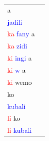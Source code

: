 \documentclass[output=paper,colorlinks,citecolor=brown]{langscibook}
\begin{document}
\begin{table}
\begin{minipage}{.24\textwidth}
\begin{tabular}{ll} 
\lsptoprule
a \\
\textcolor{blue}{jadili}   \\
\textcolor{red}{ka} \textcolor{blue}{fany} a     \\ 
\textcolor{red}{ka} \textcolor{blue}{zidi}       \\ 
\textcolor{red}{ki} \textcolor{blue}{ingi} a     \\ 
\textcolor{red}{ki} \textcolor{blue}{w} a  \\
\textcolor{red}{ki} wemo   \\
ko   \\
\textcolor{blue}{kubali}   \\   
\textcolor{red}{li} ko  \\
\textcolor{red}{li} \textcolor{blue}{kubali}      \\ 


\end{tabular}
\end{minipage}
\end{table}
\end{document}
